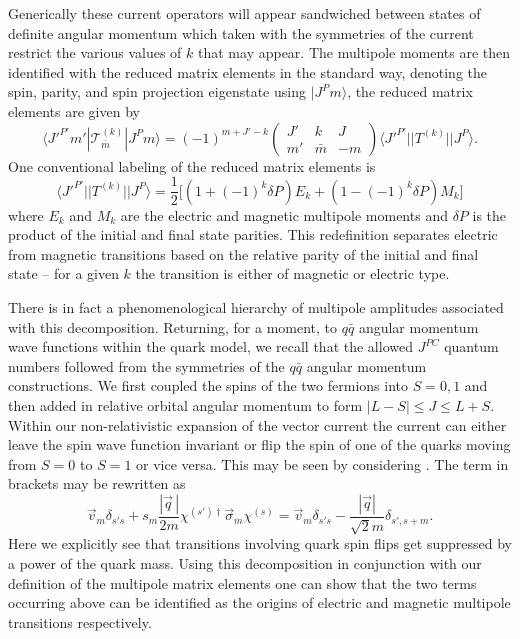 Generically these current operators will appear sandwiched between states of definite angular momentum which taken with the symmetries of the current restrict the various values of $k$ that may appear. The multipole moments are then identified with the reduced matrix elements in the standard way, denoting the spin, parity, and spin projection eigenstate using $|J^{P}m\rangle$, the reduced matrix elements are given by 
\begin{equation}
\langle J'^{P'} m'  | \mathcal{T}^{(k)}_{\bar{m}} | J^P m \rangle 
= (-1)^{m+J'-k}\begin{pmatrix}J' & k & J \\ m' & \bar{m} & -m\end{pmatrix} \langle J'^{P'} || T^{(k)} || J^P\rangle  \label{QM::3J_decomp}.
\end{equation}
One conventional labeling of the reduced matrix elements is 
\begin{equation*}
\langle J'^{P'} || T^{(k)} || J^{P} \rangle = \frac{1}{2} \Big[ \left( 1 + (-1)^k\delta P \right) E_k + \left( 1 - (-1)^k\delta P \right) M_k\Big] \label{QM::multipole_convention}
\end{equation*}
where $E_k$ and $M_k$ are the electric and magnetic multipole moments and $\delta P$ is the product of the initial and final state parities. This redefinition separates electric from magnetic transitions based on the relative parity of the initial and final state -- for a given $k$ the transition is either of magnetic or electric type. 

There is in fact a phenomenological hierarchy of multipole amplitudes associated with this decomposition. Returning, for a moment, to $q\bar{q}$ angular momentum wave functions within the quark model, we recall that the allowed $J^{PC}$ quantum numbers followed from the symmetries of the $q\bar{q}$ angular momentum constructions. We first coupled the spins of the two fermions into $S=0,1$ and then added in relative orbital angular momentum to form $|L -S| \leq J \leq L+S$. Within our non-relativistic expansion of the vector current the current can either leave the spin wave function invariant or flip the spin of one of the quarks moving from $S=0$ to $S=1$ or vice versa. This may be seen by considering  . The term in brackets may be rewritten as 
\begin{equation}
\vec{v}_m \delta_{s's}+ s_m\frac{|\vec{q}\,|}{2m} \chi^{(s')\dagger} \vec{\sigma}_{m}  \chi^{(s)} = \vec{v}_m \delta_{s's}  -\frac{|\vec{q}|}{\sqrt{2}m}\delta_{s',s+m}.
\end{equation}
Here we explicitly see that transitions involving quark spin flips get suppressed by a power of the quark mass. Using this decomposition in conjunction with our definition of the multipole matrix elements one can show that the two terms occurring above can be identified as the origins of electric and magnetic multipole transitions respectively. 

